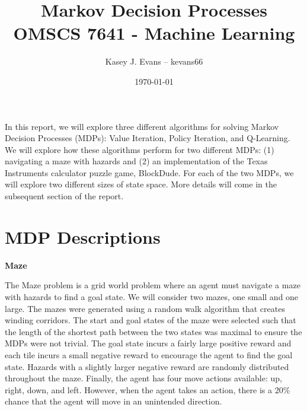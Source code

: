 \documentclass{article}
\title{Markov Decision Processes \\ OMSCS 7641 - Machine Learning} %
\author{Kasey J. Evans -- kevans66} %
\date{\today} %
\begin{document}
\graphicspath{{../figures/}}

\maketitle %



In this report, we will explore three different algorithms for solving Markov Decision
Processes (MDPs): Value Iteration, Policy Iteration, and Q-Learning. We will explore
how these algorithms perform for two different MDPs: (1) navigating a maze with hazards
and (2) an implementation of the Texas Instruments calculator puzzle game, BlockDude. For
each of the two MDPs, we will explore two different sizes of state space. More details
will come in the subsequent section of the report.


\section{MDP Descriptions} \label{MDPS}

\textbf{Maze}

The Maze problem is a grid world problem where an agent must navigate a maze with
hazards to find a goal state. We will consider two mazes, one small and one large. The
mazes were generated using a random walk algorithm that creates winding corridors. The
start and goal states of the maze were selected such that the length of the shortest path
between the two states was maximal to ensure the MDPs were not trivial. The goal state
incurs a fairly large positive reward and each tile incurs a small negative reward to
encourage the agent to find the goal state. Hazards with a slightly larger negative
reward are randomly distributed throughout the maze. Finally, the agent has four move
actions available: up, right, down, and left. However, when the agent takes an action,
there is a 20\% chance that the agent will move in an unintended direction.
\end{document}
